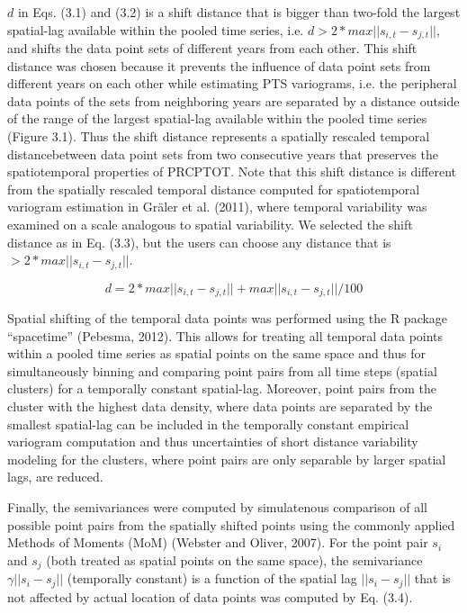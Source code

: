 $d$ in Eqs. (3.1) and (3.2) is a shift distance that is bigger than two-fold the largest spatial-lag available within the pooled time series, i.e. $d>2*max||s_{i,t}-s_{j,t}||$, and shifts the data point sets of different years from each other. This shift distance was chosen because it prevents the influence of data point sets from different years on each other while estimating PTS variograms, i.e. the peripheral data points of the sets from neighboring years are separated by a distance outside of the range of the largest spatial-lag available within the pooled time series (Figure 3.1). Thus the shift distance represents a spatially rescaled temporal distancebetween data point sets from two consecutive years that preserves the spatiotemporal properties of PRCPTOT. Note that this shift distance is different from the spatially rescaled temporal distance computed for spatiotemporal variogram estimation in Gräler et al. (2011), where temporal variability was examined on a scale analogous to spatial variability. We selected the shift distance as in Eq. (3.3), but the users can choose any distance that is $>2*max||s_{i,t}-s_{j,t}||$.

\begin{equation}
d=2*max||s_{i,t}-s_{j,t}||+max||s_{i,t}-s_{j,t}||/100
\end{equation}

Spatial shifting of the temporal data points was performed using the R package “spacetime” (Pebesma, 2012). This allows for treating all temporal data points within a pooled time series as spatial points on the same space and thus for simultaneously binning and comparing point pairs from all time steps (spatial clusters) for a temporally constant spatial-lag. Moreover, point pairs from the cluster with the highest data density, where data points are separated by the smallest spatial-lag can be included in the temporally constant empirical variogram computation and thus uncertainties of short distance variability modeling for the clusters, where point pairs are only separable by larger spatial lags, are reduced.

Finally, the semivariances were computed by simulatenous comparison of all possible point pairs from the spatially shifted points using the commonly applied Methods of Moments (MoM) (Webster and Oliver, 2007). For the point pair $s_i$ and $s_j$ (both treated as spatial points on the same space), the semivariance $\gamma||s_i-s_j||$ (temporally constant) is a function of the spatial lag $||s_i-s_j||$ that is not affected by actual location of data points was computed by Eq. (3.4).

